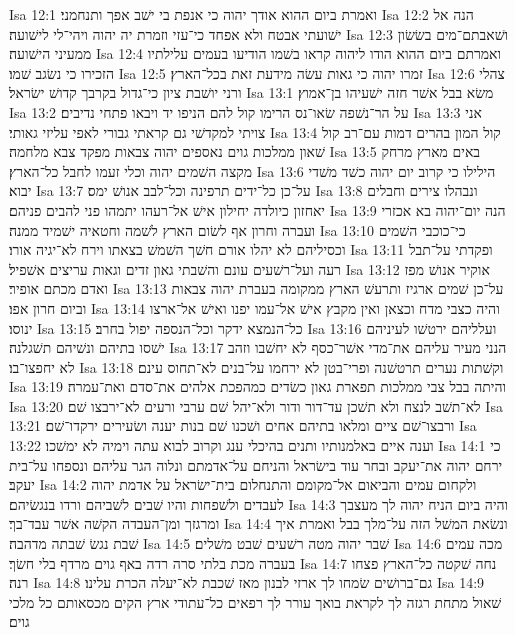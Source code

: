 Isa 12:1  ואמרת ביום ההוא אודך יהוה כי אנפת בי ישׁב אפך ותנחמני׃
Isa 12:2  הנה אל ישׁועתי אבטח ולא אפחד כי־עזי וזמרת יה יהוה ויהי־לי לישׁועה׃
Isa 12:3  ושׁאבתם־מים בשׂשׂון ממעיני הישׁועה׃
Isa 12:4  ואמרתם ביום ההוא הודו ליהוה קראו בשׁמו הודיעו בעמים עלילתיו הזכירו כי נשׂגב שׁמו׃
Isa 12:5  זמרו יהוה כי גאות עשׂה מידעת זאת בכל־הארץ׃
Isa 12:6  צהלי ורני יושׁבת ציון כי־גדול בקרבך קדושׁ ישׂראל׃
Isa 13:1  משׂא בבל אשׁר חזה ישׁעיהו בן־אמוץ׃
Isa 13:2  על הר־נשׁפה שׂאו־נס הרימו קול להם הניפו יד ויבאו פתחי נדיבים׃
Isa 13:3  אני צויתי למקדשׁי גם קראתי גבורי לאפי עליזי גאותי׃
Isa 13:4  קול המון בהרים דמות עם־רב קול שׁאון ממלכות גוים נאספים יהוה צבאות מפקד צבא מלחמה׃
Isa 13:5  באים מארץ מרחק מקצה השׁמים יהוה וכלי זעמו לחבל כל־הארץ׃
Isa 13:6  הילילו כי קרוב יום יהוה כשׁד משׁדי יבוא׃
Isa 13:7  על־כן כל־ידים תרפינה וכל־לבב אנושׁ ימס׃
Isa 13:8  ונבהלו צירים וחבלים יאחזון כיולדה יחילון אישׁ אל־רעהו יתמהו פני להבים פניהם׃
Isa 13:9  הנה יום־יהוה בא אכזרי ועברה וחרון אף לשׂום הארץ לשׁמה וחטאיה ישׁמיד ממנה׃
Isa 13:10  כי־כוכבי השׁמים וכסיליהם לא יהלו אורם חשׁך השׁמשׁ בצאתו וירח לא־יגיה אורו׃
Isa 13:11  ופקדתי על־תבל רעה ועל־רשׁעים עונם והשׁבתי גאון זדים וגאות עריצים אשׁפיל׃
Isa 13:12  אוקיר אנושׁ מפז ואדם מכתם אופיר׃
Isa 13:13  על־כן שׁמים ארגיז ותרעשׁ הארץ ממקומה בעברת יהוה צבאות וביום חרון אפו׃
Isa 13:14  והיה כצבי מדח וכצאן ואין מקבץ אישׁ אל־עמו יפנו ואישׁ אל־ארצו ינוסו׃
Isa 13:15  כל־הנמצא ידקר וכל־הנספה יפול בחרב׃
Isa 13:16  ועלליהם ירטשׁו לעיניהם ישׁסו בתיהם ונשׁיהם תשׁגלנה׃
Isa 13:17  הנני מעיר עליהם את־מדי אשׁר־כסף לא יחשׁבו וזהב לא יחפצו־בו׃
Isa 13:18  וקשׁתות נערים תרטשׁנה ופרי־בטן לא ירחמו על־בנים לא־תחוס עינם׃
Isa 13:19  והיתה בבל צבי ממלכות תפארת גאון כשׂדים כמהפכת אלהים את־סדם ואת־עמרה׃
Isa 13:20  לא־תשׁב לנצח ולא תשׁכן עד־דור ודור ולא־יהל שׁם ערבי ורעים לא־ירבצו שׁם׃
Isa 13:21  ורבצו־שׁם ציים ומלאו בתיהם אחים ושׁכנו שׁם בנות יענה ושׂעירים ירקדו־שׁם׃
Isa 13:22  וענה איים באלמנותיו ותנים בהיכלי ענג וקרוב לבוא עתה וימיה לא ימשׁכו׃
Isa 14:1  כי ירחם יהוה את־יעקב ובחר עוד בישׂראל והניחם על־אדמתם ונלוה הגר עליהם ונספחו על־בית יעקב׃
Isa 14:2  ולקחום עמים והביאום אל־מקומם והתנחלום בית־ישׂראל על אדמת יהוה לעבדים ולשׁפחות והיו שׁבים לשׁביהם ורדו בנגשׂיהם׃
Isa 14:3  והיה ביום הניח יהוה לך מעצבך ומרגזך ומן־העבדה הקשׁה אשׁר עבד־בך׃
Isa 14:4  ונשׂאת המשׁל הזה על־מלך בבל ואמרת איך שׁבת נגשׂ שׁבתה מדהבה׃
Isa 14:5  שׁבר יהוה מטה רשׁעים שׁבט משׁלים׃
Isa 14:6  מכה עמים בעברה מכת בלתי סרה רדה באף גוים מרדף בלי חשׂך׃
Isa 14:7  נחה שׁקטה כל־הארץ פצחו רנה׃
Isa 14:8  גם־ברושׁים שׂמחו לך ארזי לבנון מאז שׁכבת לא־יעלה הכרת עלינו׃
Isa 14:9  שׁאול מתחת רגזה לך לקראת בואך עורר לך רפאים כל־עתודי ארץ הקים מכסאותם כל מלכי גוים׃
